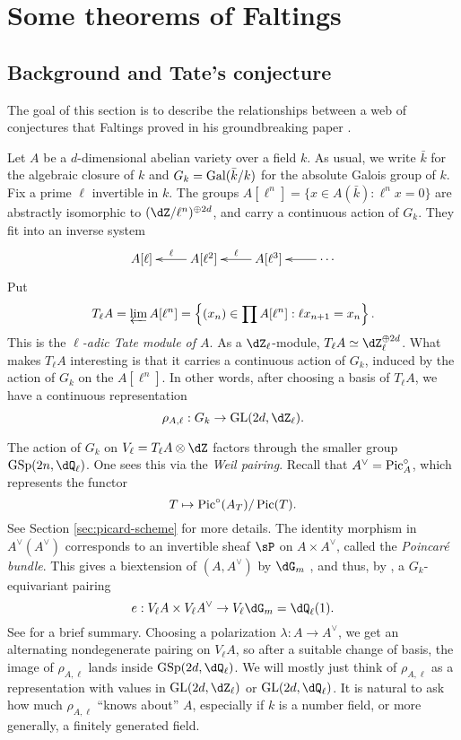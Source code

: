 




\section{Some theorems of Faltings}





\subsection{Background and Tate's conjecture}

The goal of this section is to describe the relationships between a web of 
conjectures that Faltings proved in his groundbreaking paper 
\cite{fa86}. 

Let $A$ be a $d$-dimensional abelian variety over a field $k$. As usual, we 
write $\bar k$ for the algebraic closure of $k$ and $G_k=\operatorname{Gal}(\bar k/k)$ for 
the absolute Galois group of $k$. Fix a prime $\ell$ invertible in $k$. The 
groups $A[\ell^n] = \{x\in A(\bar k):\ell^n x=0\}$ are abstractly isomorphic 
to $(\dZ/\ell^n)^{\oplus 2d}$, and carry a continuous action of $G_k$. They 
fit into an inverse system 
\[\xymatrix{
  A[\ell] 
    & A[\ell^2] \ar[l]_-\ell 
    & A[\ell^3] \ar[l]_-\ell 
    & \cdots \ar[l]
}\]
Put 
\[
  T_\ell A = \varprojlim A[\ell^n] = \left\{(x_n)\in \prod A[\ell^n] : \ell x_{n+1} = x_n\right\} \text{.}
\]
This is the \emph{$\ell$-adic Tate module of $A$}. As a $\dZ_\ell$-module, 
$T_\ell A \simeq \dZ_\ell^{\oplus 2 d}$. What makes $T_\ell A$ interesting is 
that it carries a continuous action of $G_k$, induced by the action of $G_k$ 
on the $A[\ell^n]$. In other words, after choosing a basis of $T_\ell A$, we 
have a continuous representation 
\[
  \rho_{A,\ell} : G_k \to \gl{2 d}{\dZ_\ell} \text{.}
\]

The action of $G_k$ on $V_\ell = T_\ell A\otimes\dZ$ factors through 
the smaller group $\operatorname{GSp}(2 n,\dQ_\ell)$. One sees this via the 
\emph{Weil pairing}. Recall that $A^\vee = \operatorname{Pic}_A^\circ$, which represents 
the functor 
\[
  T \mapsto \operatorname{Pic}^\circ(A_T)/\operatorname{Pic}(T) \text{.}
\]
See Section \ref{sec:picard-scheme} for more details. The identity morphism 
in $A^\vee(A^\vee)$ corresponds to an invertible sheaf $\sP$ on 
$A\times A^\vee$, called the \emph{Poincar\'e bundle}. This gives a 
biextension of $(A,A^\vee)$ by $\dG_m$ \cite[VII 2.9.5]{gr72}, and thus, by 
\cite[VIII 2.2]{gr72}, a $G_k$-equivariant pairing 
\[
  e:V_\ell A \times V_\ell A^\vee \to V_\ell \dG_m = \dQ_\ell(1) \text{.}
\]
See \cite[IX 1.0]{gr72} for a brief summary. Choosing a polarization 
$\lambda:A \to A^\vee$, we get an alternating nondegenerate pairing on 
$V_\ell A$, so after a suitable change of basis, the image of 
$\rho_{A,\ell}$ lands inside $\operatorname{GSp}(2 d,\dQ_\ell)$. We will mostly 
just think of $\rho_{A,\ell}$ as a representation with values in 
$\gl{2d}{\dZ_\ell}$ or $\gl{2d}{\dQ_\ell}$. It is 
natural to ask how much $\rho_{A,\ell}$ ``knows about'' $A$, especially if $k$ 
is a number field, or more generally, a finitely generated field. 

